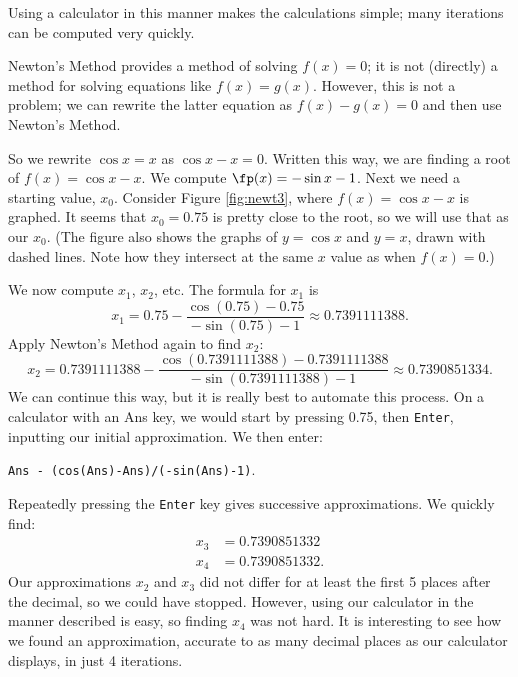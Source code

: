 Using a calculator in this manner makes the calculations simple; many iterations can be computed very quickly. \\


{Newton's Method provides a method of solving $f(x) = 0$; it is not (directly) a method for solving equations like $f(x) = g(x)$. However, this is not a problem; we can rewrite the latter equation as $f(x) - g(x)=0$ and then use Newton's Method. 

So we rewrite $\cos x=x$ as $\cos{x}-x=0$.  Written this way, we are finding a root of $f(x)=\cos{x}-x$.  We compute $\fp(x)=-\sin{x} - 1$.  Next we need a starting value, $x_0$.  Consider Figure \ref{fig:newt3}, where $f(x) = \cos x-x$ is graphed. It seems that $x_0=0.75$ is pretty close to the root, so we will use that as our $x_0$. (The figure also shows the graphs of $y=\cos x$ and $y=x$, drawn with dashed lines. Note how they intersect at the same $x$ value as when $f(x) = 0$.)


We now compute $x_1$, $x_2$, etc.  The formula for $x_1$ is 
\[
x_1 = 0.75 - \frac{\cos(0.75)-0.75}{-\sin(0.75)-1}\approx 0.7391111388.
\]
Apply Newton's Method again to find $x_2$:
\[
x_2 = 0.7391111388 - \frac{\cos(0.7391111388)-0.7391111388}{-\sin(0.7391111388)-1}\approx 0.7390851334.
\]
We can continue this way, but it is really best to automate this process.  On a calculator with an Ans key, we would start by pressing 0.75, then \texttt{Enter}, inputting our initial approximation. We then enter:
\begin{center}\texttt{Ans - (cos(Ans)-Ans)/(-sin(Ans)-1)}.\end{center}

Repeatedly pressing the \texttt{Enter} key gives successive approximations.  We quickly find:
\begin{align*}
x_3 &= 0.7390851332\\
x_4 &= 0.7390851332.
\end{align*}
Our approximations $x_2$ and $x_3$ did not differ for at least the first 5 places after the decimal, so we could have stopped. However, using our calculator in the manner described is easy, so finding $x_4$ was not hard. It is interesting to see how we found an approximation, accurate to as many decimal places as our calculator displays, in just 4 iterations.
}\\

